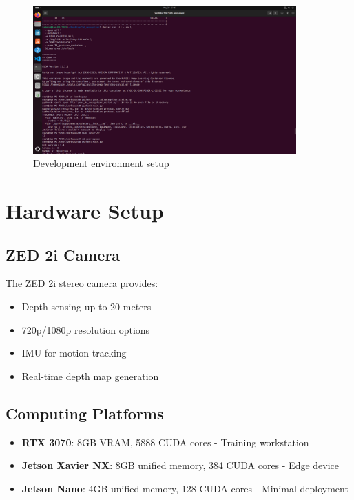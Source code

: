 \documentclass[12pt,a4paper]{report}
\begin{document}
\begin{figure}[htbp]
    \centering
    \includegraphics[width=0.9\textwidth]{figures/development_setup.png}
    \caption{Development environment setup}
    \label{fig:development_setup}
\end{figure}

\section{Hardware Setup}

\subsection{ZED 2i Camera}

The ZED 2i stereo camera provides:
\begin{itemize}
    \item Depth sensing up to 20 meters
    \item 720p/1080p resolution options
    \item IMU for motion tracking
    \item Real-time depth map generation
\end{itemize}

\subsection{Computing Platforms}

\begin{itemize}
    \item \textbf{RTX 3070}: 8GB VRAM, 5888 CUDA cores - Training workstation
    \item \textbf{Jetson Xavier NX}: 8GB unified memory, 384 CUDA cores - Edge device
    \item \textbf{Jetson Nano}: 4GB unified memory, 128 CUDA cores - Minimal deployment
\end{itemize}
\end{document}
